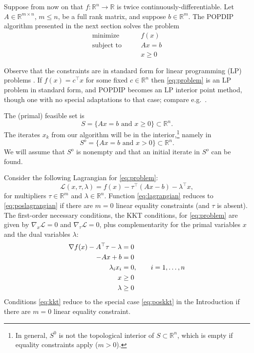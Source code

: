 \documentclass[11pt]{article}
\newcommand{\RR}{\mathbb{R}}
\newcommand{\grad}{\nabla}
\begin{document}
Suppose from now on that $f:\RR^n \to \RR$ is twice continuously-differentiable.  Let $A\in\RR^{m\times n}$, $m\le n$, be a full rank matrix, and suppose $b\in\RR^m$.  The POPDIP algorithm presented in the next section solves the problem
\begin{equation}
\begin{matrix}
\text{minimize} \qquad   & f(x) \\
\text{subject to} \qquad & A x = b \\
                         & x \ge 0
\end{matrix} \label{eq:problem}
\end{equation}

Observe that the constraints are in standard form for linear programming (LP) problems \cite[chapter 4]{GrivaNashSofer2009}.  If $f(x)=c^\top x$ for some fixed $c\in\RR^n$ then \eqref{eq:problem} is an LP problem in standard form, and POPDIP becomes an LP interior point method, though one with no special adaptations to that case; compare e.g.~\cite{ZhangTapiaDennis1992}.

The (primal) feasible set is
\begin{equation}
S = \{Ax=b \text{ and } x\ge 0\} \subset \RR^n.  \label{eq:primalfeasible}
\end{equation}
The iterates $x_k$ from our algorithm will be in the interior,\footnote{In general, $S^0$ is not the topological interior of $S \subset \RR^n$, which is empty if equality constraints apply ($m>0$).} namely in
\begin{equation}
S^o = \{Ax=b \text{ and } x > 0\} \subset \RR^n.  \label{eq:primalinterior}
\end{equation}
We will assume that $S^o$ is nonempty and that an initial iterate in $S^o$ can be found.

Consider the following Lagrangian for \eqref{eq:problem}:
\begin{equation}
\mathcal{L}(x,\tau,\lambda) = f(x) - \tau^\top (Ax - b) - \lambda^\top x, \label{eq:lagrangian}
\end{equation}
for multipliers $\tau\in\RR^m$ and $\lambda\in \RR^n$.  Function \eqref{eq:lagrangian} reduces to \eqref{eq:poslagrangian} if there are $m=0$ linear equality constraints (and $\tau$ is absent).  The first-order necessary conditions, the KKT conditions, for \eqref{eq:problem} are given by $\grad_x\mathcal{L}=0$ and $\grad_\tau\mathcal{L}=0$, plus complementarity for the primal variables $x$ and the dual variables $\lambda$:
\begin{align}
\grad f(x) - A^\top \tau - \lambda &= 0 \label{eq:kkt} \\
-A x + b &= 0 \notag \\
\lambda_i x_i &=0, \qquad i=1,\dots,n \notag \\
x &\ge 0 \notag \\
\lambda &\ge 0 \notag
\end{align}
Conditions \eqref{eq:kkt} reduce to the special case \eqref{eq:poskkt} in the Introduction if there are $m=0$ linear equality constraint.
\end{document}

